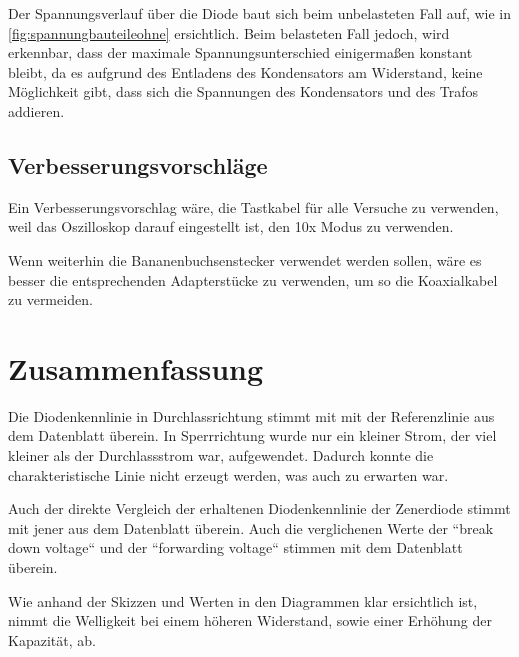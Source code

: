 \documentclass[11pt,ngerman]{scrartcl}
\begin{document}
Der Spannungsverlauf über die Diode baut sich beim unbelasteten Fall auf, wie
in \autoref{fig:spannungbauteileohne} ersichtlich. Beim belasteten Fall jedoch,
wird erkennbar, dass der maximale Spannungsunterschied einigermaßen konstant
bleibt, da es aufgrund des Entladens des Kondensators am Widerstand, keine
Möglichkeit gibt, dass sich die Spannungen des Kondensators und des Trafos
addieren.


\subsection{Verbesserungsvorschläge}


Ein Verbesserungsvorschlag wäre, die Tastkabel für alle Versuche zu verwenden,
weil das Oszilloskop darauf eingestellt ist, den 10x Modus zu verwenden.

Wenn weiterhin die Bananenbuchsenstecker verwendet werden sollen, wäre es
besser die entsprechenden Adapterstücke zu verwenden, um so die Koaxialkabel zu
vermeiden.


\section{Zusammenfassung}

Die Diodenkennlinie in Durchlassrichtung stimmt mit mit der Referenzlinie aus dem Datenblatt überein.
In Sperrrichtung wurde nur ein kleiner Strom, der viel kleiner als der Durchlassstrom war, aufgewendet. Dadurch konnte die charakteristische Linie nicht erzeugt werden, was auch zu erwarten war.

\vspace{2mm}

Auch der direkte Vergleich der erhaltenen Diodenkennlinie der Zenerdiode stimmt mit jener aus dem Datenblatt überein.
Auch die verglichenen Werte der ``break down voltage`` und der ``forwarding voltage`` stimmen mit dem Datenblatt überein.

\vspace{2mm}

Wie anhand der Skizzen und Werten in den Diagrammen klar ersichtlich ist, nimmt
die Welligkeit bei einem höheren Widerstand, sowie einer Erhöhung der
Kapazität, ab.


\newpage

\printbibliography
\listoffigures
\listoftables
\end{document}
